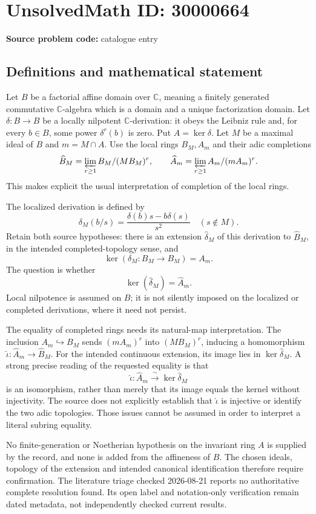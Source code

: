 \documentclass[11pt]{article}
\newcommand{\C}{\mathbb{C}}
\begin{document}
\section*{UnsolvedMath ID: 30000664}
\textbf{Source problem code:} catalogue entry
\subsection{Definitions and mathematical statement}
Let \(B\) be a factorial affine domain over \(\C\), meaning a finitely generated commutative \(\C\)-algebra which is a domain and a unique factorization domain. Let \(\delta:B\to B\) be a locally nilpotent \(\C\)-derivation: it obeys the Leibniz rule and, for every \(b\in B\), some power \(\delta^r(b)\) is zero. Put \(A=\ker\delta\). Let \(M\) be a maximal ideal of \(B\) and \(m=M\cap A\). Use the local rings \(B_M,A_m\) and their adic completions
\[
 \widehat B_M=\varprojlim_{r\geq1}B_M/(MB_M)^r,
 \qquad
 \widehat A_m=\varprojlim_{r\geq1}A_m/(mA_m)^r.
\]
This makes explicit the usual interpretation of completion of the local rings.

The localized derivation is defined by
\[
 \delta_M(b/s)=\frac{\delta(b)s-b\delta(s)}{s^2}
 \quad(s\notin M).
\]
Retain both source hypotheses: there is an extension \(\widehat\delta_M\) of this derivation to \(\widehat B_M\), in the intended completed-topology sense, and
\[
 \ker(\delta_M:B_M\to B_M)=A_m.
\]
The question is whether
\[
 \ker(\widehat\delta_M)=\widehat A_m.
\]
Local nilpotence is assumed on \(B\); it is not silently imposed on the localized or completed derivations, where it need not persist.

The equality of completed rings needs its natural-map interpretation. The inclusion \(A_m\hookrightarrow B_M\) sends \((mA_m)^r\) into \((MB_M)^r\), inducing a homomorphism \(\widehat\iota:\widehat A_m\to\widehat B_M\). For the intended continuous extension, its image lies in \(\ker\widehat\delta_M\). A strong precise reading of the requested equality is that
\[
 \widehat\iota:\widehat A_m\xrightarrow{\ \sim\ }\ker\widehat\delta_M
\]
is an isomorphism, rather than merely that its image equals the kernel without injectivity. The source does not explicitly establish that \(\widehat\iota\) is injective or identify the two adic topologies. Those issues cannot be assumed in order to interpret a literal subring equality.

No finite-generation or Noetherian hypothesis on the invariant ring \(A\) is supplied by the record, and none is added from the affineness of \(B\). The chosen ideals, topology of the extension and intended canonical identification therefore require confirmation. The literature triage checked 2026-08-21 reports no authoritative complete resolution found. Its open label and notation-only verification remain dated metadata, not independently checked current results.
\end{document}
